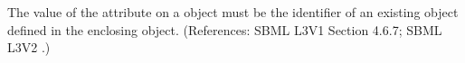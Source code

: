 The value of the attribute  on a \Species object
must be the identifier of an existing \Parameter object defined in the
enclosing \Model object.  (References: SBML L3V1 Section 4.6.7; SBML L3V2
.)
